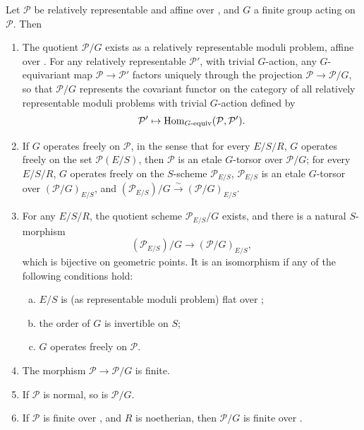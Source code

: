 \begin{kthm}\label{thm:7.1.3}
Let $\mathcal{P}$ be relatively representable and affine over \EllR, and $G$ a finite group acting on $\mathcal{P}$. Then
\begin{enumerate}[(1)]
\item The quotient $\mathcal{P}/G$ exists as a relatively representable moduli problem, affine over \EllR. For any relatively representable $\mathcal{P}'$, with trivial $G$-action, any $G$-equivariant map $\mathcal{P} \to \mathcal{P}'$ factors uniquely through the projection $\mathcal{P} \to \mathcal{P}/G$, so that $\mathcal{P}/G$ represents the covariant functor on the category of all relatively representable moduli problems with trivial $G$-action defined by
\[
\mathcal{P}' \mapsto \operatorname{Hom}_{G\text{-equiv}}(\mathcal{P}, \mathcal{P}') .
\]
\item If $G$ operates freely on $\mathcal{P}$, in the sense that for every $E/S/R$, $G$ operates freely on the set $\mathcal{P}(E/S)$, then $\mathcal{P}$ is an etale $G$-torsor over $\mathcal{P}/G$; for every $E/S/R$, $G$ operates freely on the $S$-scheme $\mathcal{P}_{E/S}$, $\mathcal{P}_{E/S}$ is an etale $G$-torsor over $(\mathcal{P}/G)_{E/S}$, and $(\mathcal{P}_{E/S})/G \xrightarrow{\ \sim\ } (\mathcal{P}/G)_{E/S}$.
\item For any $E/S/R$, the quotient scheme $\mathcal{P}_{E/S}/G$ exists, and there is a natural $S$-morphism
\[
(\mathcal{P}_{E/S})/G \to (\mathcal{P}/G)_{E/S} ,
\]
which is bijective on geometric points. It is an isomorphism if any of the following conditions hold:
\begin{enumerate}[a)]
\item $E/S$ is (as representable moduli problem) flat over \EllR;
\item the order of $G$ is invertible on $S$;
\item $G$ operates freely on $\mathcal{P}$.
\end{enumerate}
\item The morphism $\mathcal{P} \to \mathcal{P}/G$ is finite.
\item If $\mathcal{P}$ is normal, so is $\mathcal{P}/G$.
\item If $\mathcal{P}$ is finite over \EllR, and $R$ is noetherian, then $\mathcal{P}/G$ is finite over \EllR.
\end{enumerate}
\end{kthm}

